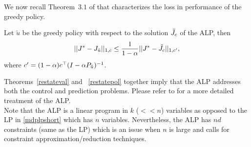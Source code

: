 We now recall Theorem~$3.1$ of \cite{ALP} that characterizes the loss in performance of the greedy policy.
\begin{theorem}\label{restatepol}
Let $\tilde{u}$ be the greedy policy with respect to the solution $\tilde{J}_c$ of the ALP, then 
\begin{align*}
||J^*-J_{\tilde{u}}||_{1,c}\leq \frac{1}{1-\alpha}||J^*-\tilde{J}_c||_{1,c'},
\end{align*}
where $c'=(1-\alpha)c^\top(I-\alpha P_{\tilde{u}})^{-1}$.
\end{theorem}
Theorems~\ref{restateval} and ~\ref{restatepol} together imply that the ALP addresses both the control and prediction problems. Please refer to \cite{ALP} for a more detailed treatment of the ALP.\\
Note that the ALP is a linear program in $k$ ($<<n$) variables as opposed to the LP in \eqref{mdplpshort} which has $n$ variables. Nevertheless, the ALP has $nd$ constraints (same as the LP) which is an issue when $n$ is large and calls for constraint approximation/reduction techniques.

